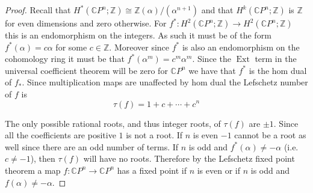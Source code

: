 \documentclass[10pt]{article}
\newcommand{\bb}[1]{\mathbb{#1}}
\DeclareMathOperator{\Ext}{Ext}
\theoremstyle{remark}
\begin{document}
\begin{proof}
  Recall that $H^*(\bb{C}P^n;\bb{Z})\cong\bb{Z}(\alpha)/(\alpha^{n+1})$ and that
  $H^k(\bb{C}P^n;\bb{Z})$ is $\bb{Z}$ for even dimensions and zero otherwise. For
  $f^*:H^2(\bb{C}P^n;\bb{Z})\rightarrow H^2(\bb{C}P^n;\bb{Z})$ this is an endomorphism on the integers.
  As such it must be of the form $f^*(\alpha)=c\alpha$ for some $c\in\bb{Z}$. Moreover since
  $f^*$ is also an endomorphism on the cohomology ring it must be that
  $f^*(\alpha^m)=c^m\alpha^m$. Since the $\Ext$ term in the universal coefficient theorem
  will be zero for $\bb{C}P^n$ we have that $f^*$ is the hom dual of $f_*$.
  Since multiplication maps are unaffected by hom dual the Lefschetz number of
  $f$ is
  \[
    \tau(f)= 1+c+\cdots+c^n
  \]

  The only possible rational roots, and thus integer roots, of $\tau(f)$ are $\pm 1$.
  Since all the coefficients are positive $1$ is not a root. If $n$ is even $-1$
  cannot be a root as well since there are an odd number of terms.
  If $n$ is odd and $f^*(\alpha)\neq-\alpha$ (i.e. $c\neq -1$), then $\tau(f)$ will have no roots.
  Therefore by the Lefschetz fixed point theorem a map $f:\bb{C}P^n\rightarrow\bb{C}P^n$
  has a fixed point if $n$ is even or if $n$ is odd and $f(\alpha)\neq -\alpha$.
\end{proof}
\end{document}
